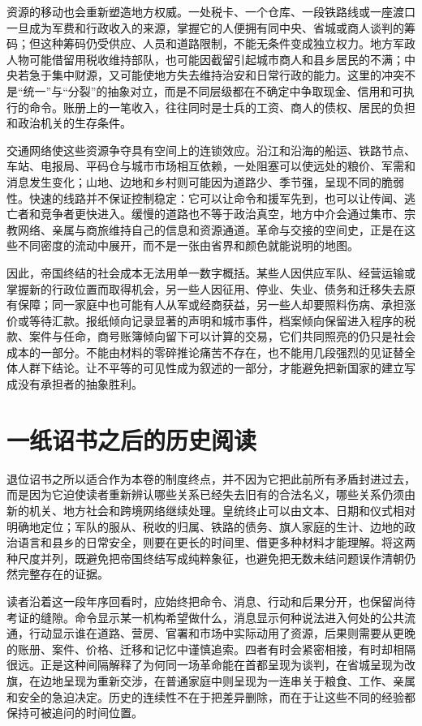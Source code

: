 资源的移动也会重新塑造地方权威。一处税卡、一个仓库、一段铁路线或一座渡口一旦成为军费和行政收入的来源，掌握它的人便拥有同中央、省城或商人谈判的筹码；但这种筹码仍受供应、人员和道路限制，不能无条件变成独立权力。地方军政人物可能借留用税收维持部队，也可能因截留引起城市商人和县乡居民的不满；中央若急于集中财源，又可能使地方失去维持治安和日常行政的能力。这里的冲突不是“统一”与“分裂”的抽象对立，而是不同层级都在不确定中争取现金、信用和可执行的命令。账册上的一笔收入，往往同时是士兵的工资、商人的债权、居民的负担和政治机关的生存条件。

交通网络使这些资源争夺具有空间上的连锁效应。沿江和沿海的船运、铁路节点、车站、电报局、平码仓与城市市场相互依赖，一处阻塞可以使远处的粮价、军需和消息发生变化；山地、边地和乡村则可能因为道路少、季节强，呈现不同的脆弱性。快速的线路并不保证控制稳定：它可以让命令和援军先到，也可以让传闻、逃亡者和竞争者更快进入。缓慢的道路也不等于政治真空，地方中介会通过集市、宗教网络、亲属与商旅维持自己的信息和资源通道。革命与交接的空间史，正是在这些不同密度的流动中展开，而不是一张由省界和颜色就能说明的地图。

因此，帝国终结的社会成本无法用单一数字概括。某些人因供应军队、经营运输或掌握新的行政位置而取得机会，另一些人因征用、停业、失业、债务和迁移失去原有保障；同一家庭中也可能有人从军或经商获益，另一些人却要照料伤病、承担涨价或等待汇款。报纸倾向记录显著的声明和城市事件，档案倾向保留进入程序的税款、案件与任命，商号账簿倾向留下可以计算的交易，它们共同照亮的仍只是社会成本的一部分。不能由材料的零碎推论痛苦不存在，也不能用几段强烈的见证替全体人群下结论。让不平等的可见性成为叙述的一部分，才能避免把新国家的建立写成没有承担者的抽象胜利。

\section{一纸诏书之后的历史阅读}

退位诏书之所以适合作为本卷的制度终点，并不因为它把此前所有矛盾封进过去，而是因为它迫使读者重新辨认哪些关系已经失去旧有的合法名义，哪些关系仍须由新的机关、地方社会和跨境网络继续处理。皇统终止可以由文本、日期和仪式相对明确地定位；军队的服从、税收的归属、铁路的债务、旗人家庭的生计、边地的政治语言和县乡的日常安全，则要在更长的时间里、借更多种材料才能理解。将这两种尺度并列，既避免把帝国终结写成纯粹象征，也避免把无数未结问题误作清朝仍然完整存在的证据。

读者沿着这一段年序回看时，应始终把命令、消息、行动和后果分开，也保留尚待考证的缝隙。命令显示某一机构希望做什么，消息显示何种说法进入何处的公共流通，行动显示谁在道路、营房、官署和市场中实际动用了资源，后果则需要从更晚的账册、案件、价格、迁移和记忆中谨慎追索。四者有时会紧密相接，有时却相隔很远。正是这种间隔解释了为何同一场革命能在首都呈现为谈判，在省城呈现为改旗，在边地呈现为重新交涉，在普通家庭中则呈现为一连串关于粮食、工作、亲属和安全的急迫决定。历史的连续性不在于把差异删除，而在于让这些不同的经验都保持可被追问的时间位置。


